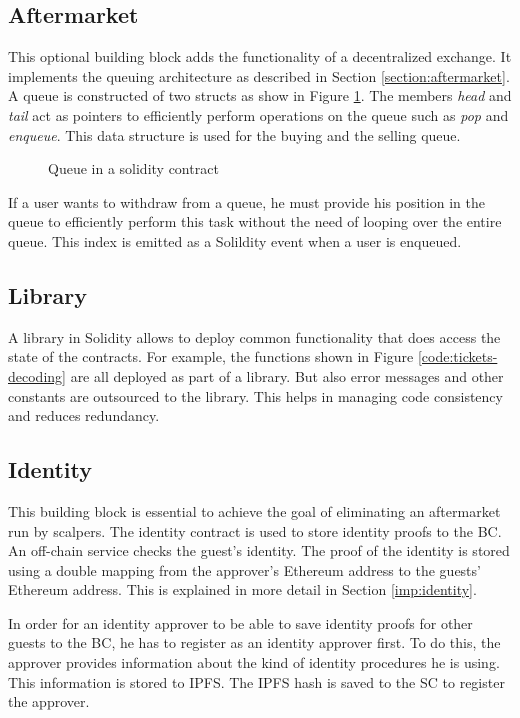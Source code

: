 \subsection{Aftermarket}
This optional building block adds the functionality of a decentralized exchange. It implements the queuing architecture as described in Section \ref{section:aftermarket}. A queue is constructed of two structs as show in Figure \ref{code:queue}. The members \textit{head} and \textit{tail} act as pointers to efficiently perform operations on the queue such as \textit{pop} and \textit{enqueue}. This data structure is used for the buying and the selling queue. 

\begin{figure}[H]
    
    \caption{Queue in a solidity contract}
    \label{code:queue}
\end{figure}

If a user wants to withdraw from a queue, he must provide his position in the queue to efficiently perform this task without the need of looping over the entire queue. This index is emitted as a Solildity event when a user is enqueued. 

\subsection{Library}
A library in Solidity allows to deploy common functionality that does access the state of the contracts. For example, the functions shown in Figure \ref{code:tickets-decoding} are all deployed as part of a library. But also error messages and other constants are outsourced to the library. This helps in managing code consistency and reduces redundancy.

\subsection{Identity}
This building block is essential to achieve the goal of eliminating an aftermarket run by scalpers. The identity contract is used to store identity proofs to the BC. An off-chain service checks the guest's identity. The proof of the identity is stored using a double mapping from the approver's Ethereum address to the guests' Ethereum address. This is explained in more detail in Section \ref{imp:identity}.

In order for an identity approver to be able to save identity proofs for other guests to the BC, he has to register as an identity approver first. To do this, the approver provides information about the kind of identity procedures he is using. This information is stored to IPFS. The IPFS hash is saved to the SC to register the approver.

